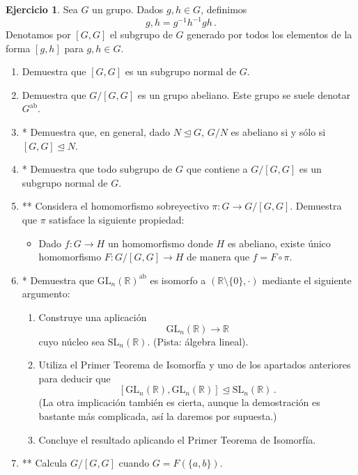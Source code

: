 \documentclass[a4paper,11pt]{amsart}
\theoremstyle{plain}
\theoremstyle{definition}
\newtheorem{ejercicio}[thm]{Ejercicio}
\theoremstyle{remark}
\begin{document}
\begin{ejercicio}
Sea $G$ un grupo. Dados $g, h \in G$, definimos 
    \[g, h  = g^{-1}h^{-1}g h \, . \]
Denotamos por $[G, G]$ el subgrupo de $G$ generado por todos los elementos de la forma $[g, h]$ para $g, h \in G$. 
\begin{enumerate}[label = \roman*)]
    \item Demuestra que $[G, G]$ es un subgrupo normal de $G$.
    \item Demuestra que $G/[G, G]$ es un grupo abeliano. Este grupo se suele denotar $G^{\text{ab}}$.
    \item {*} Demuestra que, en general, dado $N \trianglelefteq G$, $G/N$ es abeliano si y sólo si $[G, G] \unlhd N$.
    \item {*} Demuestra que todo subgrupo de $G$ que contiene a $G/[G,G]$ es un subgrupo normal de $G$.
    \item{**} Considera el homomorfismo sobreyectivo $\pi \colon G \to G/[G, G]$. Demuestra que $\pi$ satisface la siguiente propiedad: 
    \begin{itemize}
        \item Dado $f \colon G \to H$ un homomorfismo donde $H$ es abeliano, existe único homomorfismo $F \colon G/[G, G] \to H$ de manera que $f = F \circ \pi$. 
    \end{itemize}
    \item{*} Demuestra que $\text{GL}_n(\mathbb{R})^{\text{ab}}$ es isomorfo a $(\mathbb{R} \setminus \{0\}, \cdot)$ mediante el siguiente argumento:
    \begin{enumerate}
        \item Construye una aplicación  
        \[ \text{GL}_n(\mathbb{R}) \to \mathbb{R}\]
        cuyo núcleo sea $\text{SL}_n(\mathbb{R})$. (Pista: álgebra lineal).
        \item Utiliza el Primer Teorema de Isomorfía y uno de los apartados anteriores para deducir que 
        \[ [\text{GL}_n(\mathbb{R}), \text{GL}_n(\mathbb{R})] \trianglelefteq \text{SL}_n(\mathbb{R}) \, . \]
        (La otra implicación también es cierta, aunque la demostración es bastante más complicada, así la daremos por supuesta.)
        
        \item Concluye el resultado aplicando el Primer Teorema de Isomorfía.
    \end{enumerate}
    \item{**} Calcula $G/[G, G]$ cuando $G = F(\{ a, b\})$. 
\end{enumerate}
\end{ejercicio}
\end{document}
